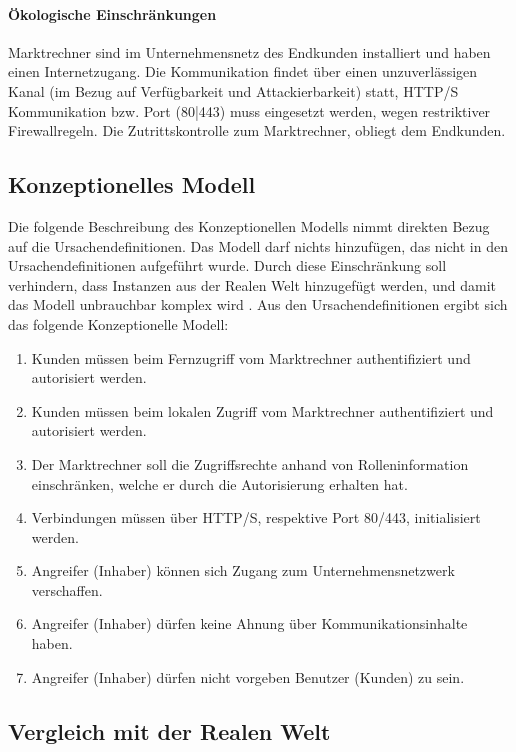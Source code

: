 \documentclass[11pt,a4paper]{report}
\begin{document}
\paragraph{Ökologische Einschränkungen} Marktrechner sind im Unternehmensnetz des Endkunden installiert und haben einen Internetzugang. Die Kommunikation findet über einen unzuverlässigen Kanal (im Bezug auf Verfügbarkeit und Attackierbarkeit) statt, HTTP/S Kommunikation bzw. Port (80|443) muss eingesetzt werden, wegen restriktiver Firewallregeln. Die Zutrittskontrolle zum Marktrechner, obliegt dem Endkunden.

\subsection{Konzeptionelles Modell}

Die folgende Beschreibung des Konzeptionellen Modells nimmt direkten Bezug auf die Ursachendefinitionen. Das Modell darf nichts hinzufügen, das nicht in den Ursachendefinitionen aufgeführt wurde. Durch diese Einschränkung soll verhindern, dass Instanzen aus der Realen Welt hinzugefügt werden, und damit das Modell unbrauchbar komplex wird \cite{gutmann6}. Aus den Ursachendefinitionen ergibt sich das folgende Konzeptionelle Modell:

\begin{enumerate}[leftmargin=*]
\item Kunden müssen beim Fernzugriff vom Marktrechner authentifiziert und autorisiert werden.
\item Kunden müssen beim lokalen Zugriff vom Marktrechner authentifiziert und autorisiert werden.
\item Der Marktrechner soll die Zugriffsrechte anhand von Rolleninformation einschränken, welche er durch die Autorisierung erhalten hat.
\item Verbindungen müssen über HTTP/S, respektive Port 80/443, initialisiert werden.
\item Angreifer (Inhaber) können sich Zugang zum Unternehmensnetzwerk verschaffen.
\item Angreifer (Inhaber) dürfen keine Ahnung über Kommunikationsinhalte haben.
\item Angreifer (Inhaber) dürfen nicht vorgeben Benutzer (Kunden) zu sein.
\end{enumerate}

\subsection{Vergleich mit der Realen Welt}
\end{document}
